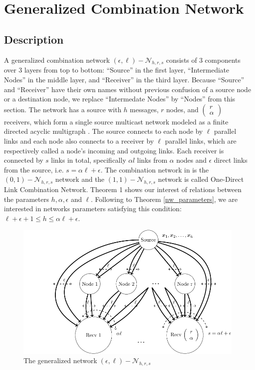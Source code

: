 \chapter{Generalized Combination Network} \label{chap:general_network}

\section{Description \label{sec:Description_GCN}}

A generalized combination network $(\epsilon,\ell)-\mathcal{N}_{h,r,s}$
consists of 3 components over 3 layers from top to bottom: ``Source''
in the first layer, ``Intermediate Nodes'' in the middle layer,
and ``Receiver'' in the third layer. Because ``Source'' and ``Receiver''
have their own names without previous confusion of a source node or
a destination node, we replace ``Intermedate Nodes'' by ``Nodes''
from this section. The network has a source with $h$ messages, $r$
nodes, and $\left(\begin{array}{c}
r\\
\alpha
\end{array}\right)$ receivers, which form a single source multicast network modeled as
a finite directed acyclic multigraph \cite{Li:2003}. The source connects
to each node by $\ell$ parallel links and each node also connects
to a receiver by $\ell$ parallel links, which are respectively called
a node's incoming and outgoing links. Each receiver is connected by
$s$ links in total, specifically $\alpha l$ links from $\alpha$
nodes and $\epsilon$ direct links from the source, i.e. $s=\alpha\ell+\epsilon$.
The combination network in \cite{Riis:2006} is the $(0,1)-\mathcal{N}_{h,r,s}$
network and the $(1,1)-\mathcal{N}_{h,r,s}$ network is called One-Direct
Link Combination Network. Theorem 1 shows our interest of relations
between the parameters $h,\alpha,\epsilon$ and $\ell$. Following
to Theorem \ref{nw_parameters}, we are interested in networks parameters
satisfying this condition: $\ell+\epsilon+1\leq h\leq\alpha\ell+\epsilon$.
\begin{figure}[H]
\caption{The generalized network $(\epsilon,\ell)-\mathcal{N}_{h,r,s}$\label{fig:The-generalized-network}}

\centering{}\includegraphics[width=0.5\paperwidth]{./figures/generalized_combination_nw}
\end{figure}

